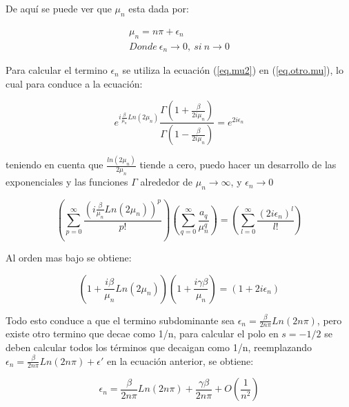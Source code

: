 De aquí se puede ver que $\mu _n$ esta dada por:


\begin{equation}
\begin{array}{c}
    \mu _n = n \pi + \epsilon _n \\
    Donde \ \epsilon _n \rightarrow{0} ,\ si \ n \rightarrow{0}
\end{array}
\label{eq.mu2}
\end{equation}



Para calcular el termino $\epsilon _n$ se utiliza la ecuación (\ref{eq.mu2}) en (\ref{eq.otro.mu}), lo cual para conduce a la ecuación:

\begin{equation}
	e ^{ i \frac{\beta}{ \mu _n} Ln(2 \mu _n)}     
    \frac{\Gamma(1 + \frac{ \beta}{2  i \mu _n} ) }
    {\Gamma(1 -  \frac{ \beta}{2  i \mu _n} )} =    
    e ^{2 i \epsilon _n }
\end{equation}

teniendo en cuenta que $\frac{ln(2 \mu _n)}{2 \mu _n }$ tiende a cero, puedo hacer un desarrollo de las exponenciales y las funciones $\Gamma$ alrededor de $ \mu _n \rightarrow \infty $, y $\epsilon _n \rightarrow 0$

\begin{equation}
    \left(
    \sum _{p = 0} ^{\infty} \frac{ \left( i \frac{\beta}{ \mu _n } Ln(2 \mu _n ) \right) ^p }{p!}
    \right)
    \left(
	\sum _{q = 0} ^{\infty} \frac{a _q}{\mu _n ^q}
	\right)
    =
    \left(
    \sum _{l = 0} ^{\infty} \frac{( 2 i \epsilon _n)^l}{l !}
    \right)
\end{equation}


Al orden mas bajo se obtiene: 

\begin{equation}
(1 + \frac{i \beta}{ \mu _n} Ln( 2 \mu _n) ) 
(1 + \frac{i  \gamma \beta}{ \mu _n})  =
(1 + 2 i \epsilon _n)
\end{equation}

Todo esto conduce a que el termino subdominante sea $\epsilon _n =  \frac{\beta }{2 n \pi}  Ln(2 n \pi)$, pero existe otro termino que decae como 1/n, para calcular el polo en $s=-1/2$ se deben calcular todos los términos que decaigan como 1/n, reemplazando $\epsilon _n =  \frac{\beta }{2 n \pi} Ln(2 n \pi) + \epsilon '$ en la ecuación anterior, se obtiene:


\begin{equation}
    \epsilon _n =  \frac{\beta }{2 n \pi} Ln(2 n \pi) +
                \frac{\gamma \beta}{2 n \pi} +
                O\left(  \frac{1}{n^2} \right)
\end{equation}

